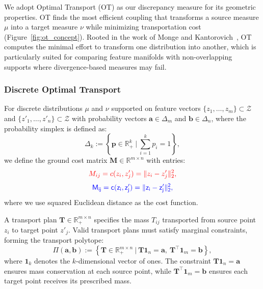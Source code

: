 \documentclass[preprint,12pt]{elsarticle}
\providecommand{\DIFadd}[1]{{\protect\color{blue} \sf #1}} %
\providecommand{\DIFdel}[1]{{\protect\color{red} \scriptsize #1}} %
\providecommand{\DIFaddbegin}{} %
\providecommand{\DIFaddend}{} %
\providecommand{\DIFdelbegin}{} %
\providecommand{\DIFdelend}{} %
\newcommand{\DIFscaledelfig}{0.5}
\newlength{\DIFdelgraphicswidth} %
\newlength{\DIFdelgraphicsheight} %
\newcommand{\DIFaddincludegraphics}[2][]{{\color{blue}\fbox{\DIFOincludegraphics[#1]{#2}}}} %
\newcommand{\DIFdelincludegraphics}[2][]{%
\sbox{\DIFdelgraphicsbox}{\DIFOincludegraphics[#1]{#2}}%
\settoboxwidth{\DIFdelgraphicswidth}{\DIFdelgraphicsbox} %
\settoboxtotalheight{\DIFdelgraphicsheight}{\DIFdelgraphicsbox} %
\scalebox{\DIFscaledelfig}{%
\parbox[b]{\DIFdelgraphicswidth}{\usebox{\DIFdelgraphicsbox}\\[-\baselineskip] \rule{\DIFdelgraphicswidth}{0em}}\llap{\resizebox{\DIFdelgraphicswidth}{\DIFdelgraphicsheight}{%
\setlength{\unitlength}{\DIFdelgraphicswidth}%
\begin{picture}(1,1)%
\thicklines\linethickness{2pt} %
{\color[rgb]{1,0,0}\put(0,0){\framebox(1,1){}}}%
{\color[rgb]{1,0,0}\put(0,0){\line( 1,1){1}}}%
{\color[rgb]{1,0,0}\put(0,1){\line(1,-1){1}}}%
\end{picture}%
}\hspace*{3pt}}} %
} %
\DeclareRobustCommand{\DIFaddbegin}{\DIFOaddbegin \let\includegraphics\DIFaddincludegraphics} %
\DeclareRobustCommand{\DIFaddend}{\DIFOaddend \let\includegraphics\DIFOincludegraphics} %
\DeclareRobustCommand{\DIFdelbegin}{\DIFOdelbegin \let\includegraphics\DIFdelincludegraphics} %
\DeclareRobustCommand{\DIFdelend}{\DIFOaddend \let\includegraphics\DIFOincludegraphics} %
\begin{document}
We adopt Optimal Transport (OT) as our discrepancy measure for its geometric properties. OT finds the most efficient coupling that transforms a source measure $\mu$ into a target measure $\nu$ while minimizing transportation cost (Figure~\ref{fig:ot_concept}). Rooted in the work of Monge and Kantorovich~\citep{villani2009optimal}, OT computes the minimal effort to transform one distribution into another, which is particularly suited for comparing feature manifolds with non-overlapping supports where divergence-based measures may fail.

\subsubsection{Discrete Optimal Transport}
\begin{sloppypar} 
For discrete distributions $\mu$ and $\nu$ supported on feature vectors $\{z_1, \dots, z_m\} \subset \mathcal{Z}$ and $\{z'_1, \dots, z'_n\} \subset \mathcal{Z}$ with probability vectors $\mathbf{a} \in \Delta_m$ and $\mathbf{b} \in \Delta_n$, where the probability simplex is defined as:
\begin{equation}
    \Delta_k := \left\{ \mathbf{p} \in \mathbb{R}^k_+ \ \Big| \ \sum_{i=1}^{k} p_i = 1 \right\},
\end{equation}
we define the ground cost matrix $\mathbf{M} \in \mathbb{R}^{m \times n}$ with entries:
\DIFdelbegin \begin{displaymath}
    \DIFdel{M_{ij} = c(z_i, z'_j) = \|z_i - z'_j\|_2^2,
}\end{displaymath}%
\DIFdelend \DIFaddbegin \begin{equation}
    \DIFadd{\label{eq:cost}
    M_{ij} = c(z_i, z'_j) = \|z_i - z'_j\|_2^2,
}\end{equation}\DIFaddend 
where we use squared Euclidean distance as the cost function.
\end{sloppypar} 
A transport plan $\mathbf{T} \in \mathbb{R}^{m \times n}_+$ specifies the mass $T_{ij}$ transported from source point $z_i$ to target point $z'_j$. Valid transport plans must satisfy marginal constraints, forming the transport polytope:
\begin{equation}
    \Pi(\mathbf{a}, \mathbf{b}) := \left\{ \mathbf{T} \in \mathbb{R}^{m \times n}_+ \ \Big| \ \mathbf{T}\mathbf{1}_n = \mathbf{a}, \ \mathbf{T}^\top\mathbf{1}_m = \mathbf{b} \right\},
\end{equation}
where $\mathbf{1}_k$ denotes the $k$-dimensional vector of ones. The constraint $\mathbf{T}\mathbf{1}_n = \mathbf{a}$ ensures mass conservation at each source point, while $\mathbf{T}^\top\mathbf{1}_m = \mathbf{b}$ ensures each target point receives its prescribed mass.
\end{document}

